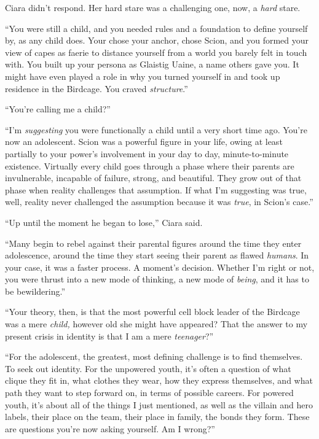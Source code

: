 Ciara didn't respond.  Her hard stare was a challenging one, now, a \emph{hard }stare.



``You were still a child, and you needed rules and a foundation to define yourself by, as any child does.  Your chose your anchor, chose Scion, and you formed your view of capes as faerie to distance yourself from a world you barely felt in touch with.  You built up your persona as Glaistig Uaine, a name others gave you.  It might have even played a role in why you turned yourself in and took up residence in the Birdcage.  You craved \emph{structure}.''



``You're calling me a child?''



``I'm \emph{suggesting }you were functionally a child until a very short time ago.  You're now an adolescent.  Scion was a powerful figure in your life, owing at least partially to your power's involvement in your day to day, minute-to-minute existence.  Virtually every child goes through a phase where their parents are invulnerable, incapable of failure, strong, and beautiful.  They grow out of that phase when reality challenges that assumption.  If what I'm suggesting was true, well, reality never challenged the assumption because it was \emph{true}, in Scion's case.''



``Up until the moment he began to lose,'' Ciara said.



``Many begin to rebel against their parental figures around the time they enter adolescence, around the time they start seeing their parent as flawed \emph{humans}.  In your case, it was a faster process.  A moment's decision.  Whether I'm right or not, you were thrust into a new mode of thinking, a new mode of \emph{being}, and it has to be bewildering.''



``Your theory, then, is that the most powerful cell block leader of the Birdcage was a mere \emph{child, }however old she might have appeared?  That the answer to my present crisis in identity is that I am a mere \emph{teenager}?''



``For the adolescent, the greatest, most defining challenge is to find themselves.  To seek out identity.  For the unpowered youth, it's often a question of what clique they fit in, what clothes they wear, how they express themselves, and what path they want to step forward on, in terms of possible careers.  For powered youth, it's about all of the things I just mentioned, as well as the villain and hero labels, their place on the team, their place in family, the bonds they form.  These are questions you're now asking yourself.  Am I wrong?''



